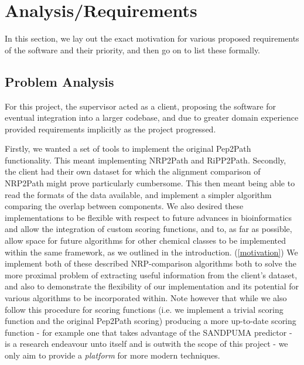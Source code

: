 \documentclass{l4proj}
\begin{document}
\chapter{Analysis/Requirements}

In this section, we lay out the exact motivation for various proposed requirements of the software and their priority, and then go on to list these formally.

\section{Problem Analysis}

For this project, the supervisor acted as a client, proposing the software for eventual integration into a larger codebase, and due to greater domain experience provided requirements implicitly as the project progressed. 

Firstly, we wanted a set of tools to implement the original Pep2Path functionality. This meant implementing NRP2Path and RiPP2Path. Secondly, the client had their own dataset for which the alignment comparison of NRP2Path might prove particularly cumbersome. This then meant being able to read the formats of the data available, and implement a simpler algorithm comparing the overlap between components. We also desired these implementations to be flexible with respect to future advances in bioinformatics and allow the integration of custom scoring functions, and to, as far as possible, allow space for future algorithms for other chemical classes to be implemented within the same framework, as we outlined in the introduction. (\ref{motivation}) We implement both of these described NRP-comparison algorithms both to solve the more proximal problem of extracting useful information from the client's dataset, and also to demonstrate the flexibility of our implementation and its potential for various algorithms to be incorporated within. Note however that while we also follow this procedure for scoring functions (i.e. we implement a trivial scoring function and the original Pep2Path scoring) producing a more up-to-date scoring function - for example one that takes advantage of the SANDPUMA predictor - is a research endeavour unto itself and is outwith the scope of this project - we only aim to provide a \textit{platform} for more modern techniques.
\end{document}
